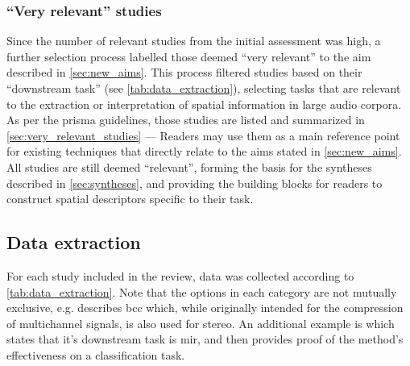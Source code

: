 \documentclass[referee,pdflatex,sn-mathphys-num]{sn-jnl}%
\newcommand{\q}[1]{\enquote{#1}}
\begin{document}
\subsubsection{\q{Very relevant} studies}
Since the number of relevant studies from the initial assessment was high, a further selection process labelled those deemed \q{very relevant} to the aim described in \cref{sec:new_aims}. This process filtered studies based on their \q{downstream task} (see \cref{tab:data_extraction}), selecting tasks that are relevant to the extraction or interpretation of spatial information in large audio corpora. As per the \gls{prisma} guidelines, those studies are listed and summarized in \cref{sec:very_relevant_studies} --- Readers may use them as a main reference point for existing techniques that directly relate to the aims stated in \cref{sec:new_aims}. All studies are still deemed \q{relevant}, forming the basis for the syntheses described in \cref{sec:syntheses}, and providing the building blocks for readers to construct spatial descriptors specific to their task.

\subsection{Data extraction}
\label{sec:data_extraction}
For each study included in the review, data was collected according to \cref{tab:data_extraction}. Note that the options in each category are not mutually exclusive, e.g. \cite{fallerParametricCodingSpatial2004} describes \gls{bcc} which, while originally intended for the compression of multichannel signals, is also used for stereo. An additional example is \cite{tzanetakisStereoPanningInformation2010} which states that it's downstream task is \gls{mir}, and then provides proof of the method's effectiveness on a classification task.

\newcolumntype{f}{X}
\end{document}
